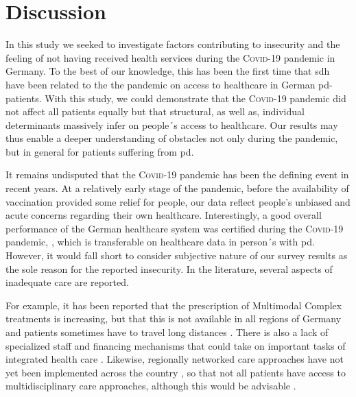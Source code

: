 \documentclass{bmcart}
\begin{document}
\newpage

\section*{Discussion}
In this study we seeked to investigate factors contributing to insecurity and the feeling of not having received health services during the \textsc{Covid}-19 pandemic in Germany. To the best of our knowledge, this has been the first time that \ac{sdh} have been related to the the pandemic on access to healthcare in German \ac{pd}-patients. With this study, we could demonstrate that the \textsc{Covid}-19 pandemic did not affect all patients equally but that structural, as well as, individual determinants massively infer on people´s access to healthcare. Our results may thus enable a deeper understanding of obstacles not only during the pandemic, but in general for patients suffering from \ac{pd}. 

It remains undisputed that the \textsc{Covid}-19 pandemic has been the defining event in recent years. At a relatively early stage of the pandemic, before the availability of vaccination provided some relief for people, our data reflect people's unbiased and acute concerns regarding their own healthcare. Interestingly, a good overall performance of the German healthcare system was certified during the \textsc{Covid}-19 pandemic, \cite{10665-341674}, which is transferable on healthcare data in person´s with \ac{pd}\cite{frundt2022impact}. However, it would fall short to consider subjective nature of our survey results as the sole reason for the reported insecurity. In the literature, several aspects of inadequate care are reported. 


For example, it has been reported that the prescription of Multimodal Complex treatments is increasing, but that this is not available in all regions of Germany and patients sometimes have to travel long distances \cite{richter2019dynamics}. There is also a lack of specialized staff and financing mechanisms that could take on important tasks of integrated health care \cite{prell2020specialized}. Likewise, regionally networked care approaches have not yet been implemented across the country \cite{van2020building}, so that not all patients have access to multidisciplinary care approaches, although this would be advisable \cite{radder2020recommendations}.
\end{document}
